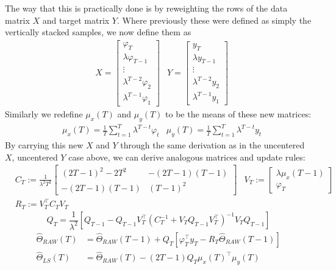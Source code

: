 The way that this is practically done is by reweighting the rows of the data matrix $X$ and target matrix $Y$. Where previously these were defined as simply the vertically stacked samples, we now define them as 
\begin{align}
  &X = 
  \begin{bmatrix}
    \varphi_T \\
    \lambda \varphi_{T-1} \\
    \vdots \\
    \lambda^{T - 2} \varphi_2 \\
    \lambda^{T - 1} \varphi_1
  \end{bmatrix}
  &Y = 
  \begin{bmatrix}
    y_T \\
    \lambda y_{T-1} \\
    \vdots \\
    \lambda^{T - 2} y_2 \\
    \lambda^{T - 1} y_1
  \end{bmatrix}
\end{align}
Similarly we redefine $\mu_x(T)$ and $\mu_y(T)$ to be the means of these new matrices:
\begin{align}
  &\mu_x(T) = \frac{1}{T}\sum_{t=1}^T \lambda^{T - t} \varphi_t
  &\mu_y(T) = \frac{1}{T}\sum_{t=1}^T \lambda^{T - t} y_t
\end{align}
By carrying this new $X$ and $Y$ through the same derivation as in the uncentered $X$, uncentered $Y$ case above, we can derive analogous matrices and update rules:
\begin{align}
  &C_T := \frac{1}{\lambda^2T^2}
  \begin{bmatrix}
    (2T - 1)^2 - 2T^2 & -(2T - 1)(T - 1) \\
    -(2T - 1)(T - 1) & (T - 1)^2
  \end{bmatrix} 
  &V_T := 
  \begin{bmatrix}
    \lambda\mu_x(T - 1) \\
    \varphi_T
  \end{bmatrix} \\
  &R_T := V_T^\top C_T V_T
\end{align}
\begin{equation}
  Q_T = \frac{1}{\lambda^2} \left[Q_{T-1} - Q_{T-1}V_T^\top\left(C_T^{-1} + V_TQ_{T-1}V_T^\top\right)^{-1}V_TQ_{T-1}\right]
\end{equation}
\begin{align}
  \hat\Theta_{RAW}(T) &= \hat\Theta_{RAW}(T-1) + Q_T\left[\varphi_T^\top y_T - R_T\hat\Theta_{RAW}(T-1)\right]\\
  \hat\Theta_{LS}(T) &= \hat\Theta_{RAW}(T) - (2T - 1)Q_T\mu_x(T)^\top \mu_y(T)
\end{align}


